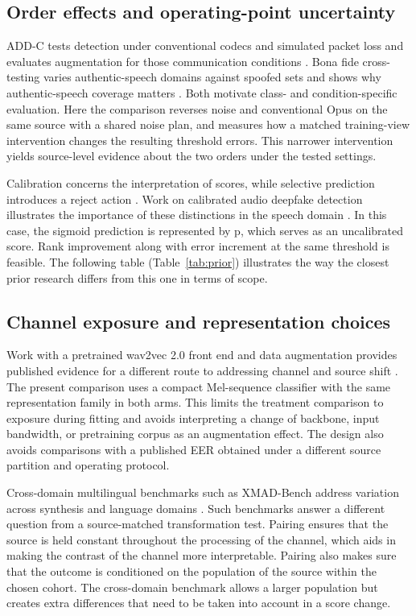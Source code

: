 \subsection{Order effects and operating-point uncertainty}

ADD-C tests detection under conventional codecs and simulated packet loss and evaluates augmentation for those communication conditions \cite{addc}. Bona fide cross-testing varies authentic-speech domains against spoofed sets and shows why authentic-speech coverage matters \cite{kwok}. Both motivate class- and condition-specific evaluation. Here the comparison reverses noise and conventional Opus on the same source with a shared noise plan, and measures how a matched training-view intervention changes the resulting threshold errors. This narrower intervention yields source-level evidence about the two orders under the tested settings.

Calibration concerns the interpretation of scores, while selective prediction introduces a reject action \cite{guo,selective}. Work on calibrated audio deepfake detection illustrates the importance of these distinctions in the speech domain \cite{pascu}. In this case, the sigmoid prediction is represented by p, which serves as an uncalibrated score. Rank improvement along with error increment at the same threshold is feasible. The following table (Table~\ref{tab:prior}) illustrates the way the closest prior research differs from this one in terms of scope.

\subsection{Channel exposure and representation choices}

Work with a pretrained wav2vec 2.0 front end and data augmentation provides published evidence for a different route to addressing channel and source shift \cite{wav2vecaugment}. The present comparison uses a compact Mel-sequence classifier with the same representation family in both arms. This limits the treatment comparison to exposure during fitting and avoids interpreting a change of backbone, input bandwidth, or pretraining corpus as an augmentation effect. The design also avoids comparisons with a published EER obtained under a different source partition and operating protocol.

Cross-domain multilingual benchmarks such as XMAD-Bench address variation across synthesis and language domains \cite{xmad}. Such benchmarks answer a different question from a source-matched transformation test. Pairing ensures that the source is held constant throughout the processing of the channel, which aids in making the contrast of the channel more interpretable. Pairing also makes sure that the outcome is conditioned on the population of the source within the chosen cohort. The cross-domain benchmark allows a larger population but creates extra differences that need to be taken into account in a score change.

